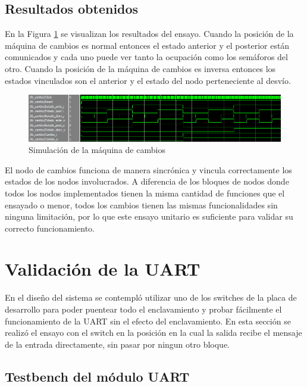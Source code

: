 	\subsection{Resultados obtenidos}
			
		En la Figura \ref{fig:Test_Cambios} se visualizan los resultados del ensayo. Cuando la posición de la máquina de cambios es normal entonces el estado anterior y el posterior están comunicados y cada uno puede ver tanto la ocupación como los semáforos del otro. Cuando la posición de la máquina de cambios es inversa entonces los estados vinculados son el anterior y el estado del nodo perteneciente al desvío.
		
		\begin{figure}[h]
		\centering
		\includegraphics[scale=0.55]{./Figures/Test/Cambio}
			\caption{Simulación de la máquina de cambios}
			\label{fig:Test_Cambios}
		\end{figure}
			
		El nodo de cambios funciona de manera sincrónica y vincula correctamente los estados de los nodos involucrados. A diferencia de los bloques de nodos donde todos los nodos implementados tienen la misma cantidad de funciones que el ensayado o menor, todos los cambios tienen las mismas funcionalidades sin ninguna limitación, por lo que este ensayo unitario es suficiente para validar su correcto funcionamiento.
				
\section{Validación de la UART}

	En el diseño del sistema se contempló utilizar uno de los switches de la placa de desarrollo para poder puentear todo el enclavamiento y probar fácilmente el funcionamiento de la UART sin el efecto del enclavamiento. En esta sección se realizó el ensayo con el switch en la posición en la cual la salida recibe el mensaje de la entrada directamente, sin pasar por ningun otro bloque.

	\subsection{Testbench del módulo UART}
			
